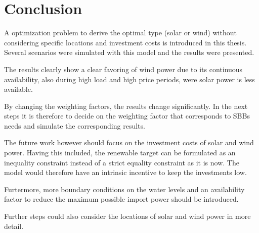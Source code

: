 \chapter{Conclusion}
A optimization problem to derive the optimal type (solar or wind) without considering specific locations and investment costs is introduced in this thesis. Several scenarios were simulated with this model and the results were presented. 

The results clearly show a clear favoring of wind power due to its continuous availability, also during high load and high price periods, were solar power is less available. 

By changing the weighting factors, the results change significantly. In the next steps it is therefore to decide on the weighting factor that corresponds to SBBs needs and simulate the corresponding results. 

The future work however should focus on the investment costs of solar and wind power. Having this included, the renewable target can be formulated as an inequality constraint instead of a strict equality constraint as it is now. The model would therefore have an intrinsic incentive to keep the investments low. 

Furtermore, more boundary conditions on the water levels and an availability factor to reduce the maximum possible import power should be introduced.  

Further steps could also consider the locations of solar and wind power in more detail. 